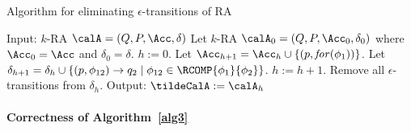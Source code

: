 \setcounter{algorithm}{2}
\begin{algorithm}[h]
\caption{Algorithm for eliminating $\epsilon$-transitions of RA}
\label{alg3}
\begin{algorithmic}[1]
  \STATE Input: $k$-RA $\calA=(Q, P, \Acc, \delta)$
  \STATE Let $k$-RA $\calA_0=(Q, P, \Acc_0, \delta_0)$ where
  $\Acc_0=\Acc$ and
  $\delta_0=\delta$.
  \STATE $h := 0$.
  \REPEAT
  \STATE Let $\Acc_{h+1}=\Acc_h\cup\{(p,\For(\phi_1))\}$.
  \ENDIF
  \STATE Let $\delta_{h+1}=\delta_h\cup\{(p,\phi_{12})\to q_2\mid 
    \phi_{12}\in\RCOMP{\phi_1}{\phi_2}\}$.
  \ENDIF
  \STATE $h := h + 1$.
  \STATE Remove all $\epsilon$-transitions from $\delta_h$.
  \STATE Output: $\tildeCalA := \calA_h$
\end{algorithmic}
\end{algorithm}


\paragraph*{Correctness of Algorithm~\ref{alg3}}

